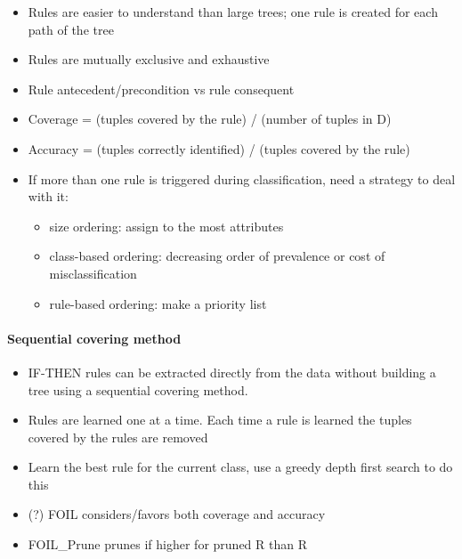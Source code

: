 \documentclass[11pt]{article}
\providecommand{\tightlist}{%
      \setlength{\itemsep}{0pt}\setlength{\parskip}{0pt}}
\begin{document}
    \begin{itemize}
\tightlist
\item
  Rules are easier to understand than large trees; one rule is created
  for each path of the tree
\item
  Rules are mutually exclusive and exhaustive
\item
  Rule antecedent/precondition vs rule consequent
\end{itemize}

    \begin{itemize}
\tightlist
\item
  Coverage = (tuples covered by the rule) / (number of tuples in D)
\item
  Accuracy = (tuples correctly identified) / (tuples covered by the
  rule)
\end{itemize}

    \begin{itemize}
\tightlist
\item
  If more than one rule is triggered during classification, need a
  strategy to deal with it:

  \begin{itemize}
  \tightlist
  \item
    size ordering: assign to the most attributes
  \item
    class-based ordering: decreasing order of prevalence or cost of
    misclassification
  \item
    rule-based ordering: make a priority list
  \end{itemize}
\end{itemize}

    \paragraph{Sequential covering method}\label{sequential-covering-method}

    \begin{itemize}
\tightlist
\item
  IF-THEN rules can be extracted directly from the data without building
  a tree using a sequential covering method.
\item
  Rules are learned one at a time. Each time a rule is learned the
  tuples covered by the rules are removed
\item
  Learn the best rule for the current class, use a greedy depth first
  search to do this
\item
  (?) FOIL considers/favors both coverage and accuracy
\item
  FOIL\_Prune prunes if higher for pruned R than R
\end{itemize}
\end{document}
